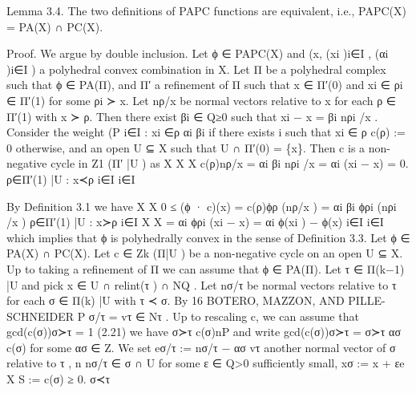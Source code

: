 \documentclass[
  11pt,
]{article}
\newenvironment{Shaded}{}{}
\newcommand{\NormalTok}[1]{#1}
\begin{document}
\begin{Shaded}
\begin{Highlighting}[]
\NormalTok{Lemma 3.4. The two definitions of PAPC functions are equivalent, i.e.,}
\NormalTok{                                        PAPC(X) = PA(X) ∩ PC(X).}

\NormalTok{Proof. We argue by double inclusion. Let ϕ ∈ PAPC(X) and (x, (xi )i∈I , (αi )i∈I ) a polyhedral}
\NormalTok{convex combination in X. Let Π be a polyhedral complex such that ϕ ∈ PA(Π), and Π′ a refinement}
\NormalTok{of Π such that x ∈ Π′(0) and xi ∈ ρi ∈ Π′(1) for some ρi ≻ x. Let nρ/x be normal vectors relative to}
\NormalTok{x for each ρ ∈ Π′(1) with x ≻ ρ. Then there exist βi ∈ Q≥0 such that xi − x = βi nρi /x . Consider}
\NormalTok{the weight                  (P}
\NormalTok{                                i∈I : xi ∈ρ αi βi if there exists i such that xi ∈ ρ}
\NormalTok{                    c(ρ) :=}
\NormalTok{                             0                    otherwise,}
\NormalTok{and an open U ⊆ X such that U ∩ Π′(0) = \{x\}. Then c is a non{-}negative cycle in Z1 (Π′ |U ) as}
\NormalTok{                     X                   X                 X}
\NormalTok{                             c(ρ)nρ/x =     αi βi nρi /x =   αi (xi − x) = 0.}
\NormalTok{                     ρ∈Π′(1) |U : x≺ρ               i∈I                    i∈I}

\NormalTok{By Definition 3.1 we have}
\NormalTok{                                              X                               X}
\NormalTok{                   0 ≤ (ϕ · c)(x) =                        c(ρ)ϕρ (nρ/x ) =            αi βi ϕρi (nρi /x )}
\NormalTok{                                        ρ∈Π′(1) |U : x≻ρ                         i∈I}
\NormalTok{                                        X                         X}
\NormalTok{                                    =         αi ϕρi (xi − x) =          αi ϕ(xi ) − ϕ(x)}
\NormalTok{                                        i∈I                        i∈I}
\NormalTok{which implies that ϕ is polyhedrally convex in the sense of Definition 3.3.}
\NormalTok{   Let ϕ ∈ PA(X) ∩ PC(X). Let c ∈ Zk (Π|U ) be a non{-}negative cycle on an open U ⊆ X.}
\NormalTok{Up to taking a refinement of Π we can assume that ϕ ∈ PA(Π). Let τ ∈ Π(k−1) |U and pick}
\NormalTok{x ∈ U ∩ relint(τ ) ∩ NQ . Let nσ/τ be normal vectors relative to τ for each σ ∈ Π(k) |U with τ ≺ σ. By}
\NormalTok{16                                   BOTERO, MAZZON, AND PILLE{-}SCHNEIDER}
\NormalTok{              P}
\NormalTok{                        σ/τ = vτ ∈ Nτ . Up to rescaling c, we can assume that gcd(c(σ))σ≻τ = 1}
\NormalTok{(2.21) we have σ≻τ c(σ)nP}
\NormalTok{and write gcd(c(σ))σ≻τ = σ≻τ ασ c(σ) for some ασ ∈ Z. We set}
\NormalTok{                    eσ/τ := nσ/τ − ασ vτ another normal vector of σ relative to τ ,}
\NormalTok{                    n}
\NormalTok{                                 nσ/τ ∈ σ ∩ U for some ε ∈ Q\textgreater{}0 sufficiently small,}
\NormalTok{                      xσ := x + εe}
\NormalTok{                            X}
\NormalTok{                       S :=     c(σ) ≥ 0.}
\NormalTok{                              σ≺τ}


\end{Highlighting}
\end{Shaded}
\end{document}
